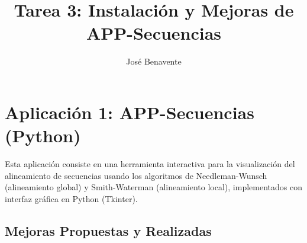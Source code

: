 \documentclass[11pt,a4paper]{article}
\title{\textbf{Tarea 3: Instalación y Mejoras de APP-Secuencias}}
\author{José Benavente}
\date{}
\begin{document}
  
  \maketitle
  
  \section*{Aplicación 1: APP-Secuencias (Python)}
  
  \noindent Esta aplicación consiste en una herramienta interactiva para la visualización del alineamiento de secuencias usando los algoritmos de Needleman-Wunsch (alineamiento global) y Smith-Waterman (alineamiento local), implementados con interfaz gráfica en Python (Tkinter).
  
  \subsection*{Mejoras Propuestas y Realizadas}
\end{document}
